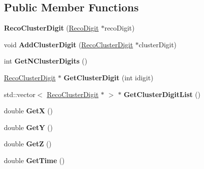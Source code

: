 \subsection*{Public Member Functions}
\begin{DoxyCompactItemize}
\item 
\hypertarget{classRecoClusterDigit_ac59d07b2db98358ce4ed64fd72a32dfd}{
{\bfseries RecoClusterDigit} (\hyperlink{classRecoDigit}{RecoDigit} $\ast$recoDigit)}
\label{classRecoClusterDigit_ac59d07b2db98358ce4ed64fd72a32dfd}

\item 
\hypertarget{classRecoClusterDigit_aee05e7e05c85121caf3591514396f297}{
void {\bfseries AddClusterDigit} (\hyperlink{classRecoClusterDigit}{RecoClusterDigit} $\ast$clusterDigit)}
\label{classRecoClusterDigit_aee05e7e05c85121caf3591514396f297}

\item 
\hypertarget{classRecoClusterDigit_a301bdd08dbfe8ea9014746c5e3e841a2}{
int {\bfseries GetNClusterDigits} ()}
\label{classRecoClusterDigit_a301bdd08dbfe8ea9014746c5e3e841a2}

\item 
\hypertarget{classRecoClusterDigit_ae522525d235f93a49e9aee48621605f4}{
\hyperlink{classRecoClusterDigit}{RecoClusterDigit} $\ast$ {\bfseries GetClusterDigit} (int idigit)}
\label{classRecoClusterDigit_ae522525d235f93a49e9aee48621605f4}

\item 
\hypertarget{classRecoClusterDigit_abe15c84c738b349800bedfa0ae04dc7e}{
std::vector$<$ \hyperlink{classRecoClusterDigit}{RecoClusterDigit} $\ast$ $>$ $\ast$ {\bfseries GetClusterDigitList} ()}
\label{classRecoClusterDigit_abe15c84c738b349800bedfa0ae04dc7e}

\item 
\hypertarget{classRecoClusterDigit_a1eb96b99e25a5c2ff6800fc3b7a3784e}{
double {\bfseries GetX} ()}
\label{classRecoClusterDigit_a1eb96b99e25a5c2ff6800fc3b7a3784e}

\item 
\hypertarget{classRecoClusterDigit_a0ae44933e670c6246d5880ac183a82b9}{
double {\bfseries GetY} ()}
\label{classRecoClusterDigit_a0ae44933e670c6246d5880ac183a82b9}

\item 
\hypertarget{classRecoClusterDigit_ae24f94ba01ef8496a16710a16be59d42}{
double {\bfseries GetZ} ()}
\label{classRecoClusterDigit_ae24f94ba01ef8496a16710a16be59d42}

\item 
\hypertarget{classRecoClusterDigit_a249e0c613ce90b65452e1d222a69950d}{
double {\bfseries GetTime} ()}
\label{classRecoClusterDigit_a249e0c613ce90b65452e1d222a69950d}


\end{DoxyCompactItemize}
